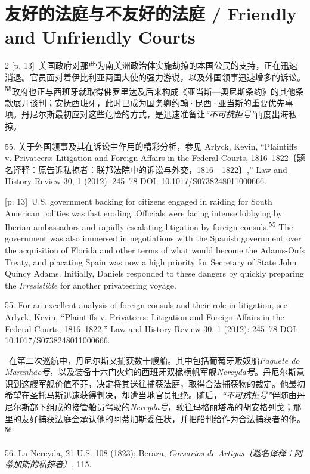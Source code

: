 \documentclass[10pt,a4paper]{article}
\begin{document}
\section*{友好的法庭与不友好的法庭 / Friendly and Unfriendly Courts}
\begin{paracol}{2}
{\scriptsize\color{gray} [p. 13]}\ 美国政府对那些为南美洲政治体实施劫掠的本国公民的支持，正在迅速消退。官员面对着伊比利亚两国大使的强力游说，以及外国领事迅速增多的诉\mbox{讼。\textsuperscript{55}}政府也正与西班牙就取得佛罗里达及后来构成《亚当斯—奥尼斯条约》的其他条款展开谈判；安抚西班牙，此时已成为国务卿约翰·昆西·亚当斯的重要优先事项。丹尼尔斯最初应对这些危险的方式，是迅速准备让\textit{“不可抗拒号”}再度出海私掠。\par{\small 55. 关于外国领事及其在诉讼中作用的精彩分析，参见 Arlyck, Kevin, “Plaintiffs v. Privateers: Litigation and Foreign Affairs in the Federal Courts, 1816–1822〔题名译释：原告诉私掠者：联邦法院中的诉讼与外交，1816—1822〕,” Law and History Review 30, 1 (2012): 245–78 DOI: 10.1017/S0738248011000666.\par}
\switchcolumn
{\scriptsize\color{gray} [p. 13]}\ U.S. government backing for citizens engaged in raiding for South American polities was fast eroding. Officials were facing intense lobbying by Iberian ambassadors and rapidly escalating litigation by foreign consuls.\nobreak\textsuperscript{55} The government was also immersed in negotiations with the Spanish government over the acquisition of Florida and other terms of what would become the Adams-Onís Treaty, and placating Spain was now a high priority for Secretary of State John Quincy Adams. Initially, Daniels responded to these dangers by quickly preparing the \textit{Irresistible} for another privateering voyage.\par{\small 55. For an excellent analysis of foreign consuls and their role in litigation, see Arlyck, Kevin, “Plaintiffs v. Privateers: Litigation and Foreign Affairs in the Federal Courts, 1816–1822,” Law and History Review 30, 1 (2012): 245–78 DOI: 10.1017/S0738248011000666.\par}
\switchcolumn*
{\scriptsize\color{gray} [p. 13]}\ 在第二次巡航中，丹尼尔斯又捕获数十艘船。其中包括葡萄牙贩奴船\textit{Paquete do Maranhão号}，以及装备十六门火炮的西班牙双桅横帆军舰\textit{Nereyda号}。丹尼尔斯意识到这艘军舰价值不菲，决定将其送往捕获法庭，取得合法捕获物的裁定。他最初希望在圣托马斯迅速获得判决，却遭当地官员拒绝。随后，\textit{“不可抗拒号”}伴随由丹尼尔斯部下组成的接管船员驾驶的\textit{Nereyda号}，驶往玛格丽塔岛的胡安格列戈；那里的友好捕获法庭会承认他的阿蒂加斯委任状，并把船判给作为合法捕获者的\mbox{他。\textsuperscript{56}}\par{\small 56. La Nereyda, 21 U.S. 108 (1823); Beraza, \textit{Corsarios de Artigas〔题名译释：阿蒂加斯的私掠者〕}, 115.\par}

\end{paracol}
\end{document}
